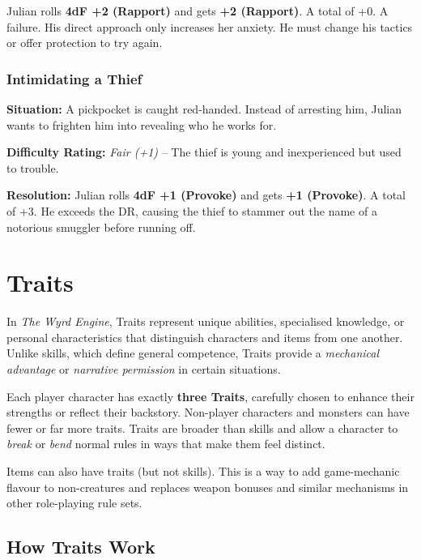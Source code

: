 \begin{DndReadAloud}{}
Julian rolls \textbf{4dF +2 (Rapport)} and gets 
\textbf{\FudgeRes{+}{-}{-}{-} +2 (Rapport)}.
  A total of +0. A failure. His direct approach only increases her anxiety. He must change his tactics or offer protection to try again.
\end{DndReadAloud}

\subsubsection{Intimidating a Thief}
\textbf{Situation:} A pickpocket is caught red-handed. Instead of arresting him, Julian wants to frighten him into revealing who he works for.

\textbf{Difficulty Rating:} \emph{Fair (+1)} – The thief is young and inexperienced but used to trouble.

\begin{DndReadAloud}{}
\textbf{Resolution:} Julian rolls \textbf{4dF +1 (Provoke)} and gets
\textbf{\FudgeRes{+}{+}{ }{ } +1 (Provoke)}.
A total of +3. He exceeds the DR, causing the thief to stammer out the name of a notorious smuggler before running off.
\end{DndReadAloud}

\section{Traits}

In \emph{The Wyrd Engine}, Traits represent unique abilities, specialised knowledge, or personal characteristics that distinguish characters and items from one another. Unlike skills, which define general competence, Traits provide a \emph{mechanical advantage} or \emph{narrative permission} in certain situations.

Each player character has exactly \textbf{three Traits}, carefully chosen to enhance their strengths or reflect their backstory. Non-player characters and monsters can have fewer or far more traits. Traits are broader than skills and allow a character to \emph{break} or \emph{bend} normal rules in ways that make them feel distinct.

Items can also have traits (but not skills). This is a way to add game-mechanic flavour to non-creatures and replaces weapon bonuses and similar mechanisms in other role-playing rule sets.

\subsection{How Traits Work}

